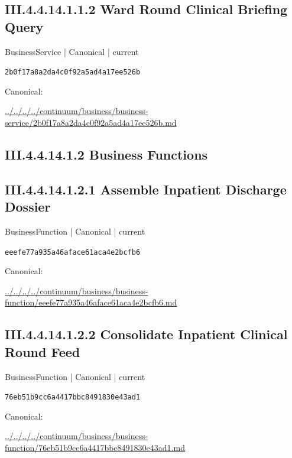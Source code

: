 \documentclass[10pt,a4paper]{article}
\begin{document}
\subsection*{III.4.4.14.1.1.2 Ward Round Clinical Briefing Query}
\label{element-2b0f17a8a2da4c0f92a5ad4a17ee526b}
{\small BusinessService | Canonical | current}\par
\texttt{2b0f17a8a2da4c0f92a5ad4a17ee526b}\par
Canonical: \par
{\footnotesize\url{../../../../continuum/business/business-service/2b0f17a8a2da4c0f92a5ad4a17ee526b.md}}\par
\subsection*{III.4.4.14.1.2 Business Functions}
\subsection*{III.4.4.14.1.2.1 Assemble Inpatient Discharge Dossier}
\label{element-eeefe77a935a46aface61aca4e2bcfb6}
{\small BusinessFunction | Canonical | current}\par
\texttt{eeefe77a935a46aface61aca4e2bcfb6}\par
Canonical: \par
{\footnotesize\url{../../../../continuum/business/business-function/eeefe77a935a46aface61aca4e2bcfb6.md}}\par
\subsection*{III.4.4.14.1.2.2 Consolidate Inpatient Clinical Round Feed}
\label{element-76eb51b9cc6a4417bbc8491830e43ad1}
{\small BusinessFunction | Canonical | current}\par
\texttt{76eb51b9cc6a4417bbc8491830e43ad1}\par
Canonical: \par
{\footnotesize\url{../../../../continuum/business/business-function/76eb51b9cc6a4417bbc8491830e43ad1.md}}\par
\end{document}
